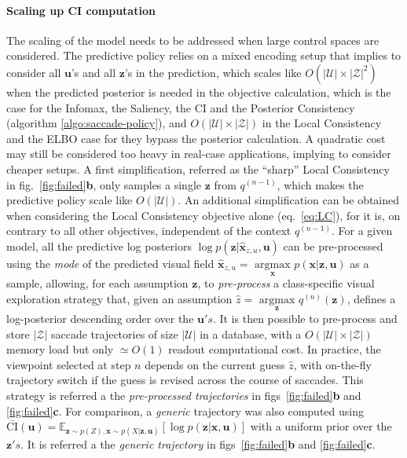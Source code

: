 \documentclass[12pt,twoside,openright]{article}
\begin{document}
\paragraph{Scaling up CI computation}
The scaling of the model needs to be addressed when large control spaces are considered. The predictive policy relies on a mixed encoding setup that implies to consider all $\boldsymbol{u}$'s and all $\boldsymbol{z}$'s in the prediction, which scales like $O(|\mathcal{U}|\times|\mathcal{Z}|^2)$ when the predicted posterior is needed in the objective calculation, which is the case for the Infomax, the Saliency, the CI and the Posterior Consistency (algorithm \ref{algo:saccade-policy}), and $O(|\mathcal{U}|\times|\mathcal{Z}|)$ in the Local Consistency and the ELBO case for they bypass the posterior calculation. A quadratic cost may still be considered too heavy in real-case applications, implying to consider cheaper setups. A first simplification, referred as the ``sharp'' Local Consistency in  fig.~\ref{fig:failed}\textbf{b}, only samples a single $\boldsymbol{z}$ from $q^{(n-1)}$, which makes the predictive policy scale like $O(|\mathcal{U}|)$. An additional simplification can be obtained when considering the Local Consistency objective alone (eq.~\ref{eq:LC}), for it is, on contrary to all other objectives, independent of the context $q^{(n-1)}$. For a given model, all the predictive log posteriors $\log p(\boldsymbol{z}|\hat{\boldsymbol{x}}_{z,u}, \boldsymbol{u})$ can be pre-processed using the \emph{mode} of the predicted visual field $\hat{\boldsymbol{x}}_{z,u} = \underset{\boldsymbol{x}}{\text{ argmax }} p(\boldsymbol{x}|\boldsymbol{z}, \boldsymbol{u})$ as a sample, allowing, for each assumption $\boldsymbol{z}$, to \emph{pre-process} a class-specific visual exploration strategy that, given an assumption $\hat{z} = \underset{\boldsymbol{\boldsymbol{z}}}{\text{ argmax }} q^{(n)}(\boldsymbol{z})$, defines a log-posterior descending order over the $\boldsymbol{u}'s$. It is then possible to pre-process and store $|\mathcal{Z}|$ saccade trajectories of size $|\mathcal{U}|$ in a database, with a $O(|\mathcal{U}|\times|\mathcal{Z}|)$ memory load but only $\simeq O(1)$ readout computational cost. In practice, the viewpoint selected at step $n$ depends on the current guess $\hat{z}$, with on-the-fly trajectory switch if the guess is revised across the course of saccades. This strategy is referred a the \emph{pre-processed trajectories} in figs~\ref{fig:failed}\textbf{b} and \ref{fig:failed}\textbf{c}.
For comparison, a \emph{generic} trajectory was also computed using $\bar{\text{CI}}(\boldsymbol{u})
= \mathbb{E}_{\boldsymbol{z} \sim p(Z), \boldsymbol{x} \sim p(X|\boldsymbol{z}, \boldsymbol{u})}\left[ \log p(\boldsymbol{z}|\boldsymbol{x}, \boldsymbol{u})\right]$ with a uniform prior over the $\boldsymbol{z}'s$.  
It is referred a the \emph{generic trajectory} in figs~\ref{fig:failed}\textbf{b} and \ref{fig:failed}\textbf{c}.
\end{document}
